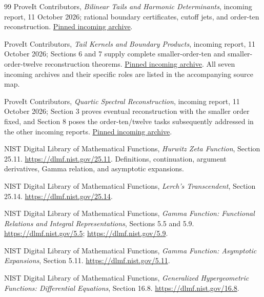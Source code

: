\begin{thebibliography}{99}
ProveIt Contributors,
\emph{Bilinear Tails and Harmonic Determinants}, incoming report,
11 October 2026; rational boundary certificates, cutoff jets,
and order-ten reconstruction.
\href{https://github.com/VladimirReshetnikov/ProveIt/blob/e3d7ec5d3f9be259c1f91edaea4389f4e79b5b03/docs/incoming/ProveIt_Bilinear_Tails_and_Determinants_2026-10-11.zip}{Pinned incoming archive}.

ProveIt Contributors,
\emph{Tail Kernels and Boundary Products}, incoming report,
11 October 2026; Sections 6 and 7 supply complete smaller-order-ten
and smaller-order-twelve reconstruction theorems.
\href{https://github.com/VladimirReshetnikov/ProveIt/blob/e3d7ec5d3f9be259c1f91edaea4389f4e79b5b03/docs/incoming/ProveIt_Tail_Kernels_and_Boundary_Products_2026-10-11.zip}{Pinned incoming archive}.
All seven incoming archives and their specific roles are listed in
the accompanying source map.

ProveIt Contributors,
\emph{Quartic Spectral Reconstruction}, incoming report,
11 October 2026; Section 3 proves eventual reconstruction with the
smaller order fixed, and Section 8 poses the order-ten/twelve tasks
subsequently addressed in the other incoming reports.
\href{https://github.com/VladimirReshetnikov/ProveIt/blob/e3d7ec5d3f9be259c1f91edaea4389f4e79b5b03/docs/incoming/ProveIt_Quartic_Spectral_Reconstruction_2026-10-11.zip}{Pinned incoming archive}.

NIST Digital Library of Mathematical Functions,
\emph{Hurwitz Zeta Function}, Section 25.11.
\url{https://dlmf.nist.gov/25.11}.
Definitions, continuation, argument derivatives, Gamma relation,
and asymptotic expansions.

NIST Digital Library of Mathematical Functions,
\emph{Lerch's Transcendent}, Section 25.14.
\url{https://dlmf.nist.gov/25.14}.

NIST Digital Library of Mathematical Functions,
\emph{Gamma Function: Functional Relations and Integral Representations},
Sections 5.5 and 5.9.
\url{https://dlmf.nist.gov/5.5};
\url{https://dlmf.nist.gov/5.9}.

NIST Digital Library of Mathematical Functions,
\emph{Gamma Function: Asymptotic Expansions}, Section 5.11.
\url{https://dlmf.nist.gov/5.11}.

NIST Digital Library of Mathematical Functions,
\emph{Generalized Hypergeometric Functions: Differential Equations},
Section 16.8.
\url{https://dlmf.nist.gov/16.8}.


\end{thebibliography}
